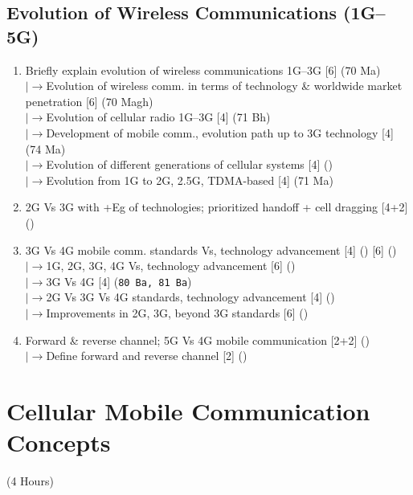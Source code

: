 \documentclass[12pt]{article}
\newcommand{\lb}{\\$\left|\rightarrow\right.$}
\begin{document}
  \subsection{Evolution of Wireless Communications (1G--5G)}
    \begin{enumerate}[topsep=0pt, noitemsep]
      \item Briefly explain evolution of wireless communications 1G--3G \hfill [6] (70 Ma)
        \lb Evolution of wireless comm. in terms of technology \& worldwide market penetration \hfill [6] (70 Magh)
        \lb Evolution of cellular radio 1G--3G \hfill [4] (71 Bh)
        \lb Development of mobile comm., evolution path up to 3G technology \hfill [4] (74 Ma)
        \lb Evolution of different generations of cellular systems \hfill [4] ()
        \lb Evolution from 1G to 2G, 2.5G, TDMA-based \hfill [4] (71 Ma)
      \item 2G Vs 3G with +Eg of technologies; prioritized handoff + cell dragging \hfill [4+2] ()
      \item 3G Vs 4G mobile comm. standards Vs, technology advancement \hfill [4] () [6] ()
        \lb 1G, 2G, 3G, 4G Vs, technology advancement \hfill [6] ()
        \lb 3G Vs 4G \hfill [4] (\texttt{80 Ba, 81 Ba})
        \lb 2G Vs 3G Vs 4G standards, technology advancement \hfill [4] ()
        \lb Improvements in 2G, 3G, beyond 3G standards \hfill [6] ()
      \item Forward \& reverse channel; 5G Vs 4G mobile communication \hfill [2+2] ()
        \lb Define forward and reverse channel \hfill [2] ()
    \end{enumerate}

\pagebreak
\section{Cellular Mobile Communication Concepts}
\begin{center}(4 Hours)\end{center}
\end{document}
